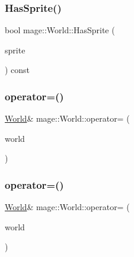 \hypertarget{classmage_1_1_world_ae4a5abbdb2267c75e62f8ec666d9434c}{}\label{classmage_1_1_world_ae4a5abbdb2267c75e62f8ec666d9434c} 
\subsubsection{\texorpdfstring{Has\+Sprite()}{HasSprite()}}
{\footnotesize\ttfamily bool mage\+::\+World\+::\+Has\+Sprite (\begin{DoxyParamCaption}\item[{const \hyperlink{namespacemage_a1e01ae66713838a7a67d30e44c67703e}{Shared\+Ptr}$<$ \hyperlink{classmage_1_1_sprite_object}{Sprite\+Object} $>$}]{sprite }\end{DoxyParamCaption}) const}

\hypertarget{classmage_1_1_world_aa7074e3847c9fbe1466aa833f194eed0}{}\label{classmage_1_1_world_aa7074e3847c9fbe1466aa833f194eed0} 
\subsubsection{\texorpdfstring{operator=()}{operator=()}\hspace{0.1cm}{\footnotesize\ttfamily [1/2]}}
{\footnotesize\ttfamily \hyperlink{classmage_1_1_world}{World}\& mage\+::\+World\+::operator= (\begin{DoxyParamCaption}\item[{const \hyperlink{classmage_1_1_world}{World} \&}]{world }\end{DoxyParamCaption})\hspace{0.3cm}{\ttfamily [delete]}}

\hypertarget{classmage_1_1_world_a0440e945dfd0291174ce6dc33e5d8335}{}\label{classmage_1_1_world_a0440e945dfd0291174ce6dc33e5d8335} 
\subsubsection{\texorpdfstring{operator=()}{operator=()}\hspace{0.1cm}{\footnotesize\ttfamily [2/2]}}
{\footnotesize\ttfamily \hyperlink{classmage_1_1_world}{World}\& mage\+::\+World\+::operator= (\begin{DoxyParamCaption}\item[{\hyperlink{classmage_1_1_world}{World} \&\&}]{world }\end{DoxyParamCaption})\hspace{0.3cm}{\ttfamily [delete]}}

